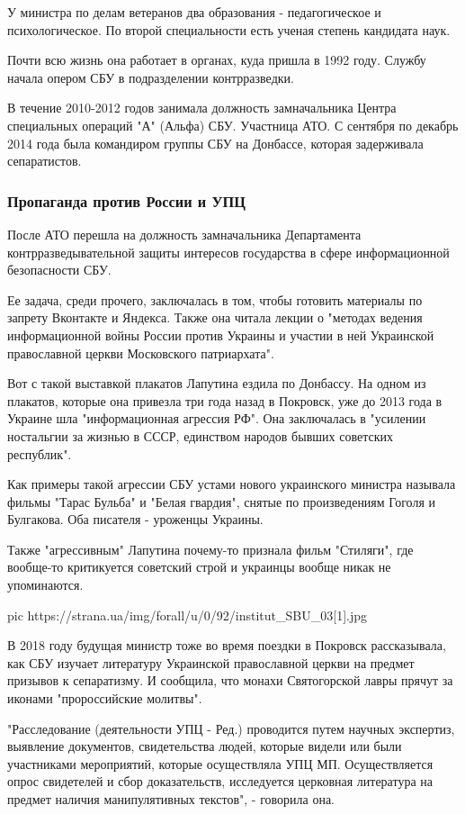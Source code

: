 У министра по делам ветеранов два образования - педагогическое и
психологическое. По второй специальности есть ученая степень кандидата наук.  

Почти всю жизнь она работает в органах, куда пришла в 1992 году. Службу начала
опером СБУ в подразделении контрразведки. 

В течение 2010-2012 годов занимала должность замначальника Центра специальных
операций "А" (Альфа) СБУ. Участница АТО. С сентября по декабрь 2014 года была
командиром группы СБУ на Донбассе, которая задерживала сепаратистов. 

\subsubsection{Пропаганда против России и УПЦ}

После АТО перешла на должность замначальника Департамента контрразведывательной
защиты интересов государства в сфере информационной безопасности СБУ.

Ее задача, среди прочего, заключалась в том, чтобы готовить материалы по
запрету Вконтакте и Яндекса. Также она читала лекции о "методах ведения
информационной войны России против Украины и участии в ней Украинской
православной церкви Московского патриархата". 

Вот с такой выставкой плакатов Лапутина ездила по Донбассу. На одном из
плакатов, которые она привезла три года назад в Покровск, уже до 2013 года в
Украине шла "информационная агрессия РФ". Она заключалась в "усилении
ностальгии за жизнью в СССР, единством народов бывших советских республик". 

Как примеры такой агрессии СБУ устами нового украинского министра называла
фильмы "Тарас Бульба" и "Белая гвардия", снятые по произведениям Гоголя и
Булгакова. Оба писателя - уроженцы Украины.

Также "агрессивным" Лапутина почему-то признала фильм "Стиляги", где вообще-то
критикуется советский строй и украинцы вообще никак не упоминаются. 

\ifcmt
pic https://strana.ua/img/forall/u/0/92/institut_SBU_03[1].jpg 
\fi

В 2018 году будущая министр тоже во время поездки в Покровск рассказывала, как
СБУ изучает литературу Украинской православной церкви на предмет призывов к
сепаратизму. И сообщила, что монахи Святогорской лавры прячут за иконами
"пророссийские молитвы". 

"Расследование (деятельности УПЦ - Ред.) проводится путем научных экспертиз,
выявление документов, свидетельства людей, которые видели или были участниками
мероприятий, которые осуществляла УПЦ МП. Осуществляется опрос свидетелей и
сбор доказательств, исследуется церковная литература на предмет наличия
манипулятивных текстов", - говорила она.

